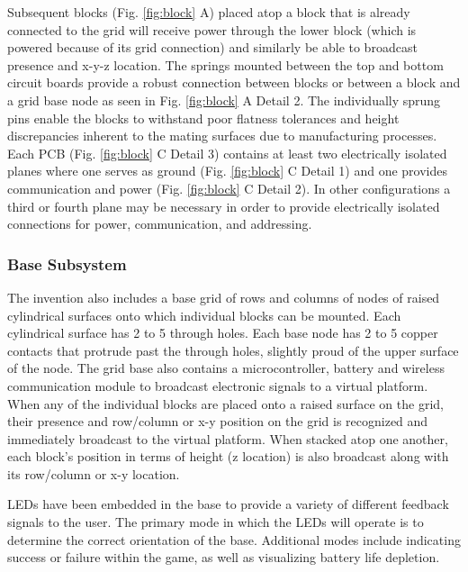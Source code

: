 \documentclass[]{article}
\begin{document}
Subsequent blocks (Fig. \ref{fig:block} A) placed atop a block that is already connected to the grid will receive power through the lower block (which is powered because of its grid connection) and similarly be able to broadcast presence and x-y-z location. The springs mounted between the top and bottom circuit boards provide a robust connection between blocks or between a block and a grid base node as seen in Fig. \ref{fig:block} A Detail 2.  The individually sprung pins  enable the blocks to withstand poor flatness tolerances and height discrepancies inherent to the mating surfaces due to manufacturing processes. Each PCB (Fig. \ref{fig:block} C Detail 3) contains at least two electrically isolated planes where one serves as ground (Fig. \ref{fig:block} C Detail 1) and one provides communication and power (Fig. \ref{fig:block} C Detail 2). In other configurations a third or fourth plane may be necessary in order to provide electrically isolated connections for power, communication, and addressing. 


\subsubsection{Base Subsystem}
The invention also includes a base grid of rows and columns of nodes of raised cylindrical surfaces onto which individual blocks can be mounted. Each cylindrical surface has 2 to 5 through holes. Each base node has 2 to 5 copper contacts that protrude past the through holes, slightly proud of  the upper surface of the node. The grid base also contains a microcontroller, battery and wireless communication module to broadcast electronic signals to a virtual platform. When any of the individual blocks are placed onto a raised surface on the grid, their presence and row/column or x-y position on the grid is recognized and immediately broadcast to the virtual platform. When stacked atop one another, each block’s position in terms of height (z location) is also broadcast along with its row/column or x-y location.

LEDs have been embedded in the base to provide a variety of different feedback signals to the user.  The primary mode in which the LEDs will operate is to determine the correct orientation of the base.  Additional modes include indicating success or failure within the game, as well as visualizing battery life depletion.
\end{document}
